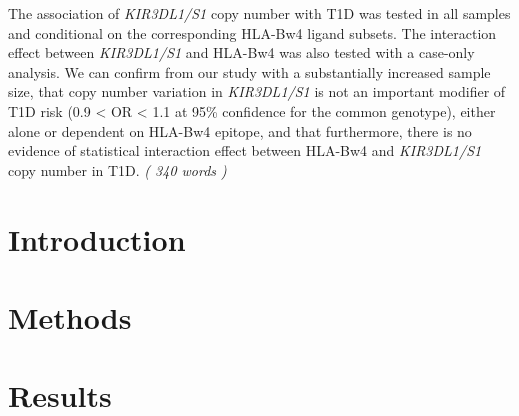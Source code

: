 \documentclass[12pt,a4paper,twoside]{article}
\begin{document}
{%
The association of \emph{KIR3DL1/S1} copy number with T1D was tested in all samples and conditional on the corresponding HLA-Bw4 ligand subsets.
The interaction effect between \emph{KIR3DL1/S1} and HLA-Bw4 was also tested with a case-only analysis.
We can confirm from our study with a substantially increased sample size, that copy number variation in \emph{KIR3DL1/S1} is not an important modifier of T1D risk (0.9 < OR < 1.1 at 95\% confidence for the common genotype), either alone or dependent on HLA-Bw4 epitope, and that furthermore, there is no evidence of statistical interaction effect between HLA-Bw4 and \emph{KIR3DL1/S1} copy number in T1D.  
\emph{( 340 words )}
}


\doublespacing

\section{Introduction}


\section{Methods}


\section{Results}

\end{document}
